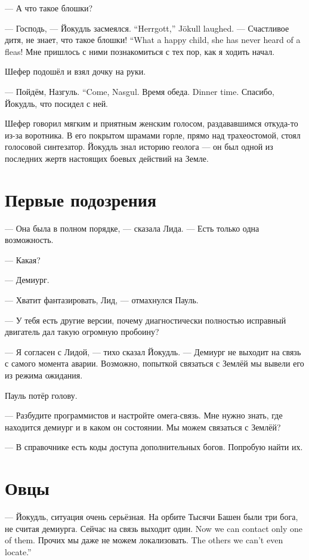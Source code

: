 --- А что такое блошки?

{--- Господь, --- Йокудль засмеялся.}
{``Herrgott,'' Jökull laughed.}
{--- Счастливое дитя, не знает, что такое блошки!}
{``What a happy child, she has never heard of a fleas!}
Мне пришлось с ними познакомиться с тех пор, как я ходить начал.

Шефер подошёл и взял дочку на руки.

{--- Пойдём, Назгуль.}
{``Come, Nasgul.}
{Время обеда.}
{Dinner time.}
Спасибо, Йокудль, что посидел с ней.

Шефер говорил мягким и приятным женским голосом, раздававшимся откуда-то из-за воротника.
В его покрытом шрамами горле, прямо над трахеостомой, стоял голосовой синтезатор.
Йокудль знал историю геолога --- он был одной из последних жертв настоящих боевых действий на Земле.

\section{Первые подозрения}

--- Она была в полном порядке, --- сказала Лида.
--- Есть только одна возможность.

--- Какая?

--- Демиург.

--- Хватит фантазировать, Лид, --- отмахнулся Пауль.

--- У тебя есть другие версии, почему диагностически полностью исправный двигатель дал такую огромную пробоину?

--- Я согласен с Лидой, --- тихо сказал Йокудль.
--- Демиург не выходит на связь с самого момента аварии.
Возможно, попыткой связаться с Землёй мы вывели его из режима ожидания.

Пауль потёр голову.

--- Разбудите программистов и настройте омега-связь.
Мне нужно знать, где находится демиург и в каком он состоянии.
Мы можем связаться с Землёй?

--- В справочнике есть коды доступа дополнительных богов.
Попробую найти их.

\section{Овцы}

--- Йокудль, ситуация очень серьёзная.
На орбите Тысячи Башен были три бога, не считая демиурга.
{Сейчас на связь выходит один.}
{Now we can contact only one of them.}
{Прочих мы даже не можем локализовать.}
{The others we can't even locate.''}


